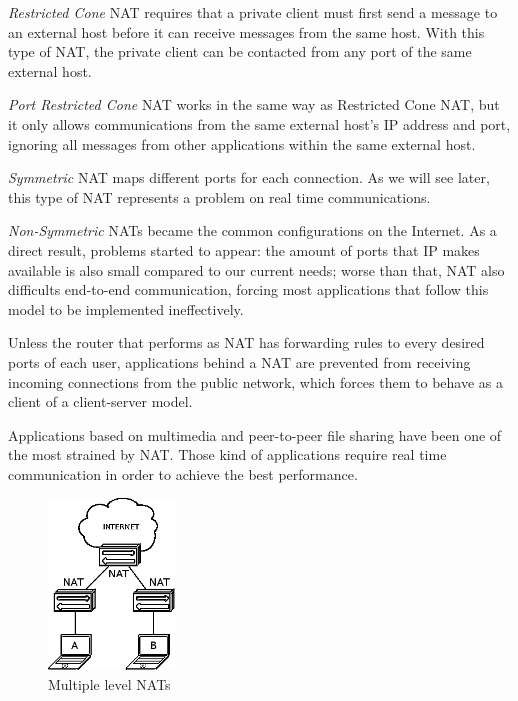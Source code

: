 \emph{Restricted Cone} \ac{NAT} requires that a private client must first send a message to an external host before it can receive messages from the same host. With this type of \ac{NAT}, the private client can be contacted from any port of the same external host.

\emph{Port Restricted Cone} \ac{NAT} works in the same way as Restricted Cone \ac{NAT}, but it only allows communications from the same external host's IP address and port, ignoring all messages from other applications within the same external host.

\emph{Symmetric} NAT maps different ports for each connection. As we will see later, this type of \ac{NAT} represents a problem on real time communications.

\emph{Non-Symmetric} \ac{NAT}s became the common configurations on the Internet. As a direct result, problems started to appear: the amount of ports that \ac{IP} makes available is also small compared to our current needs; worse than that, \ac{NAT} also difficults end-to-end communication, forcing most applications that follow this model to be implemented ineffectively.

{\color{blue}Unless the router that performs as \ac{NAT} has forwarding rules to every desired ports of each user}, applications behind a \ac{NAT} are prevented from receiving incoming connections from the public network, which forces them to behave as a client of a client-server model. 


Applications based on multimedia and peer-to-peer file sharing have been one of the most strained by \ac{NAT}. Those kind of applications require real time communication in order to achieve the best performance.

\begin{figure}[H]
	\centering
	\includegraphics[width=0.30\textwidth]{figures/multinat.png}
	\caption{Multiple level \ac{NAT}s}
\end{figure}


